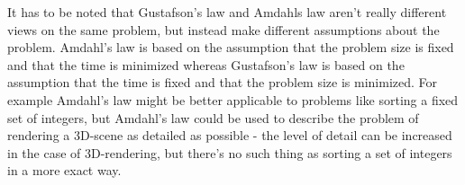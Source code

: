 \documentclass[main.tex]{subfiles}
\begin{document}
It has to be noted that Gustafson's law and Amdahls law aren't really different views on the same problem, but instead make different assumptions about the problem. Amdahl's law is based on the assumption that the problem size is fixed and that the time is minimized whereas Gustafson's law is based on the assumption that the time is fixed and that the problem size is minimized. For example Amdahl's law might be better applicable to problems like sorting a fixed set of integers, but Amdahl's law could be used to describe the problem of rendering a 3D-scene as detailed as possible - the level of detail can be increased in the case of 3D-rendering, but there's no such thing as sorting a set of integers in a more exact way.

\pagebreak
\end{document}
